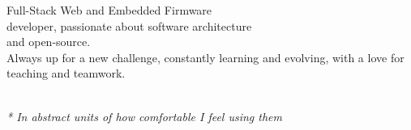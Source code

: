 \documentclass[9pt]{developercv} %
\begin{document}
\vspace{0.4cm}


\begin{minipage}[t]{0.45\textwidth} %
	\vspace{-\baselineskip} %

	
	Full-Stack Web and Embedded Firmware\\ developer, passionate about software architecture\\ and open-source.\\
        Always up for a new challenge, constantly learning and evolving, with a love for teaching and teamwork.
\end{minipage}
\hfill %
\begin{minipage}[t]{0.5\textwidth} %
	\vspace{-\baselineskip} %
	\begin{barchart}{5.5}
	\end{barchart}\\
        \small{\textit{* In abstract units of how comfortable I feel using them}}
\end{minipage}

\vspace{0.4cm}
\end{document}
